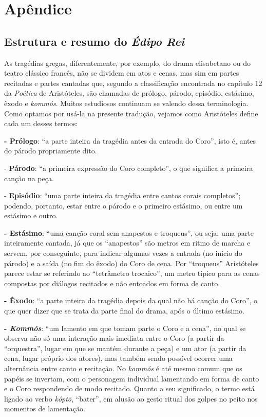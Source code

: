 \chapter{Apêndice} 

\section{Estrutura e resumo do \emph{Édipo Rei}}

As tragédias gregas, diferentemente, por exemplo, do drama elisabetano
ou do teatro clássico francês, não se dividem em atos e cenas, mas sim
em partes recitadas e partes cantadas que, segundo a classificação
encontrada no capítulo 12 da \emph{Poética} de Aristóteles, são chamadas
de prólogo, párodo, episódio, estásimo, êxodo e \emph{kommós}. Muitos
estudiosos continuam se valendo dessa terminologia. Como optamos por
usá-la na presente tradução, vejamos como Aristóteles define cada um
desses termos:

\textbf{- Prólogo}: ``a parte inteira da tragédia antes da entrada do
Coro'', isto é, antes do párodo propriamente dito.

- \textbf{Párodo}: ``a primeira expressão do Coro completo'', o que
significa a primeira canção na peça.

- \textbf{Episódio}: ``uma parte inteira da tragédia entre cantos corais
completos''; podendo, portanto, estar entre o párodo e o primeiro
estásimo, ou entre um estásimo e outro.

\textbf{- Estásimo}: ``uma canção coral sem anapestos e troqueus'', ou
seja, uma parte inteiramente cantada, já que os ``anapestos'' são metros
em ritmo de marcha e servem, por conseguinte, para indicar algumas vezes
a entrada (no início do párodo) e a saída (no fim do êxodo) do Coro de
cena. Por ``troqueus'' Aristóteles parece estar se referindo ao
``tetrâmetro trocaico'', um metro típico para as cenas compostas por
diálogos recitados e não entoados em forma de canto.

\textbf{- Êxodo}: ``a parte inteira da tragédia depois da qual não há
canção do Coro'', o que quer dizer que se trata da parte final do drama,
após o último estásimo.

\textbf{- \emph{Kommós}}: ``um lamento em que tomam parte o Coro e a
cena'', no qual se observa não só uma interação mais imediata entre o
Coro (a partir da ``orquestra'', lugar em que se mantém durante a peça) e um
ator (a partir da cena, lugar próprio dos atores), mas também sendo
possível ocorrer uma alternância entre canto e recitação. No
\emph{kommós} é até mesmo comum que os papéis se invertam, com o
personagem individual lamentando em forma de canto e o Coro respondendo
de modo recitado. Quanto a seu significado, o termo está ligado ao verbo
\emph{kóptō}, ``bater'', em alusão ao gesto ritual dos golpes no peito
nos momentos de lamentação.

